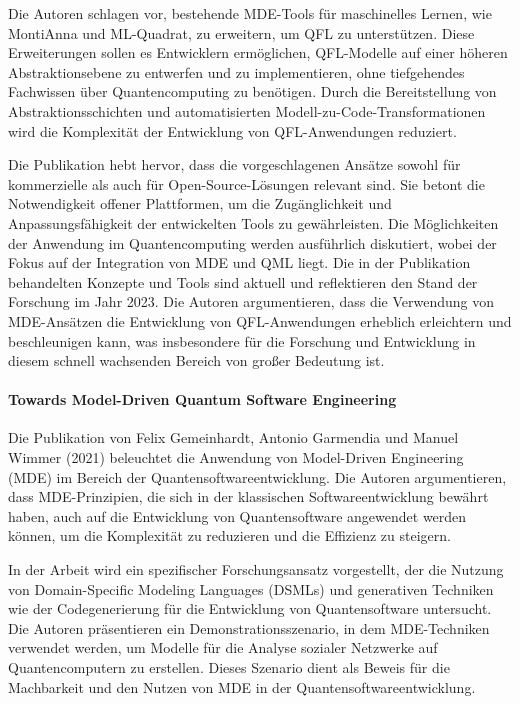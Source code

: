 Die Autoren schlagen vor, bestehende MDE-Tools für maschinelles Lernen, wie MontiAnna und ML-Quadrat, zu erweitern, um QFL 
zu unterstützen. Diese Erweiterungen sollen es Entwicklern ermöglichen, QFL-Modelle auf einer höheren 
Abstraktionsebene zu entwerfen und zu implementieren, ohne tiefgehendes Fachwissen über Quantencomputing zu benötigen. 
Durch die Bereitstellung von Abstraktionsschichten und automatisierten Modell-zu-Code-Transformationen wird die Komplexität 
der Entwicklung von QFL-Anwendungen reduziert.

Die Publikation hebt hervor, dass die vorgeschlagenen Ansätze sowohl für kommerzielle als auch für 
Open-Source-Lösungen relevant sind. Sie betont die Notwendigkeit offener Plattformen, um die Zugänglichkeit und 
Anpassungsfähigkeit der entwickelten Tools zu gewährleisten. Die Möglichkeiten der Anwendung im Quantencomputing werden 
ausführlich diskutiert, wobei der Fokus auf der Integration von MDE und QML liegt. Die in der Publikation 
behandelten Konzepte und Tools sind aktuell und reflektieren den Stand der Forschung im Jahr 2023. 
Die Autoren argumentieren, dass die Verwendung von MDE-Ansätzen die Entwicklung von QFL-Anwendungen 
erheblich erleichtern und beschleunigen kann, was insbesondere für die Forschung und 
Entwicklung in diesem schnell wachsenden Bereich von großer Bedeutung ist.

\paragraph{Towards Model-Driven Quantum Software Engineering}

Die Publikation von Felix Gemeinhardt, Antonio Garmendia und Manuel Wimmer (2021) beleuchtet die Anwendung von 
Model-Driven Engineering (MDE) im Bereich der Quantensoftwareentwicklung. Die Autoren argumentieren, dass MDE-Prinzipien, 
die sich in der klassischen Softwareentwicklung bewährt haben, auch auf die Entwicklung von Quantensoftware angewendet 
werden können, um die Komplexität zu reduzieren und die Effizienz zu steigern.

In der Arbeit wird ein spezifischer Forschungsansatz vorgestellt, der die Nutzung von Domain-Specific Modeling Languages (DSMLs) und 
generativen Techniken wie der Codegenerierung für die Entwicklung von Quantensoftware untersucht. Die Autoren 
präsentieren ein Demonstrationsszenario, in dem MDE-Techniken verwendet werden, um Modelle für die Analyse 
sozialer Netzwerke auf Quantencomputern zu erstellen. Dieses Szenario dient als Beweis für die Machbarkeit 
und den Nutzen von MDE in der Quantensoftwareentwicklung.

